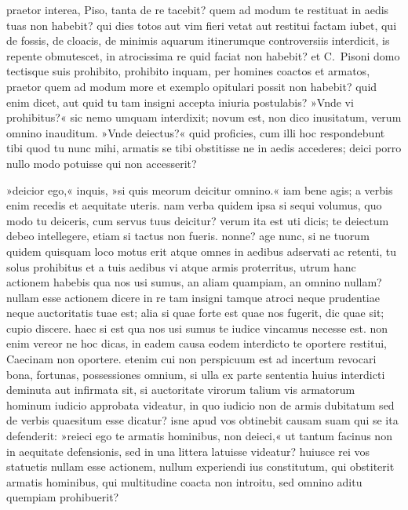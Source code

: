  praetor interea, Piso, tanta de re tacebit? quem ad modum te restituat in aedis tuas non habebit? qui dies totos aut vim fieri vetat aut restitui factam iubet, qui de fossis, de cloacis, de minimis aquarum itinerumque controversiis interdicit, is repente obmutescet, in atrocissima re quid faciat non habebit? et C.~Pisoni domo tectisque suis prohibito, prohibito inquam, per homines coactos et armatos, praetor quem ad modum more et exemplo opitulari possit non habebit? quid enim dicet, aut quid tu tam insigni accepta iniuria postulabis? »Vnde vi prohibitus?« sic nemo umquam interdixit; novum est, non dico inusitatum, verum omnino inauditum. »Vnde deiectus?« quid proficies, cum illi hoc respondebunt tibi quod tu nunc mihi, armatis se tibi obstitisse ne in aedis accederes; deici porro nullo modo potuisse qui non accesserit?

 »deicior ego,« inquis, »si quis meorum deicitur omnino.« iam bene agis; a verbis enim recedis et aequitate uteris. nam verba quidem ipsa si sequi volumus, quo modo tu deiceris, cum servus tuus deicitur? verum ita est uti dicis; te deiectum debeo intellegere, etiam si tactus non fueris. nonne? age nunc, si ne tuorum quidem quisquam loco motus erit atque omnes in aedibus adservati ac retenti, tu solus prohibitus et a tuis aedibus vi atque armis proterritus, utrum hanc actionem habebis qua nos usi sumus, an aliam quampiam, an omnino nullam? nullam esse actionem dicere in re tam insigni tamque atroci neque prudentiae neque auctoritatis tuae est; alia si quae forte est quae nos fugerit, dic quae sit; cupio discere.  haec si est qua nos usi sumus te iudice vincamus necesse est. non enim vereor ne hoc dicas, in eadem causa eodem interdicto te oportere restitui, Caecinam non oportere. etenim cui non perspicuum est ad incertum revocari bona, fortunas, possessiones omnium, si ulla ex parte sententia huius interdicti deminuta aut infirmata sit, si auctoritate virorum talium vis armatorum hominum iudicio approbata videatur, in quo iudicio non de armis dubitatum sed de verbis quaesitum esse dicatur? isne apud vos obtinebit causam suam qui se ita defenderit: »reieci ego te armatis hominibus, non deieci,« ut tantum facinus non in aequitate defensionis, sed in una littera latuisse videatur?  huiusce rei vos statuetis nullam esse actionem, nullum experiendi ius constitutum, qui obstiterit armatis hominibus, qui multitudine coacta non introitu, sed omnino aditu quempiam prohibuerit?

